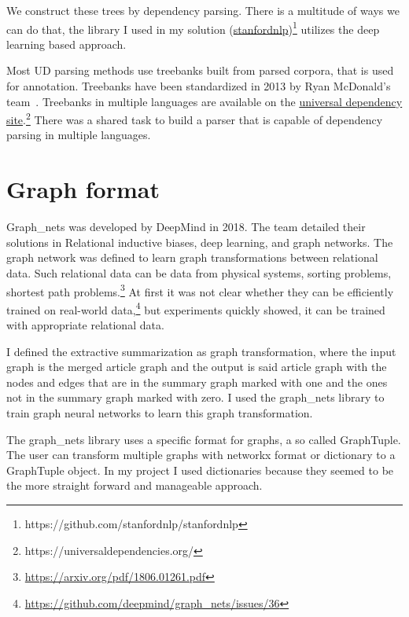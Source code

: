 We construct these trees by dependency parsing. There is a multitude of ways we can do that, the library I used in my solution (\href{https://github.com/stanfordnlp/stanfordnlp}{stanfordnlp})\footnote{https://github.com/stanfordnlp/stanfordnlp} utilizes the deep learning based approach.

Most UD parsing methods use treebanks built from parsed corpora, that is used for annotation. Treebanks have been standardized in 2013 by Ryan McDonald's team~\cite{TextRank}. Treebanks in multiple languages are available on the \href{https://universaldependencies.org/}{universal dependency site}.\footnote{https://universaldependencies.org/} There was a shared task\cite{ParserSharedTask} to build a parser that is capable of dependency parsing in multiple languages.

\section{Graph format}

Graph\_nets was developed by DeepMind in 2018. The team detailed their solutions in Relational inductive biases, deep learning, and graph networks\cite{GraphNet}. The graph network was defined to learn graph transformations between relational data. Such relational data can be data from physical systems, sorting problems, shortest path problems.\footnote{\url{https://arxiv.org/pdf/1806.01261.pdf}} At first it was not clear whether they can be efficiently trained on real-world data,\footnote{\url{https://github.com/deepmind/graph\_nets/issues/36}} but experiments quickly showed, it can be trained with appropriate relational data.

I defined the extractive summarization as graph transformation, where the input graph is the merged article graph and the output is said article graph with the nodes and edges that are in the summary graph marked with one and the ones not in the summary graph marked with zero. I used the graph\_nets library to train graph neural networks to learn this graph transformation.
	
The graph\_nets library uses a specific format for graphs, a so called GraphTuple. The user can transform multiple graphs with networkx format or dictionary	 to a GraphTuple object. In my project I used dictionaries because they seemed to be the more straight forward and manageable approach.

